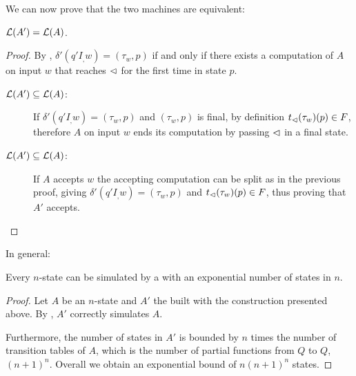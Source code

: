 We can now prove that the two machines are equivalent:
\begin{thrm}\label{thm:transtab2DFA}
	$\mathcal L(A')=\mathcal L(A)$.
\end{thrm}
\begin{proof}
	By , $\delta'(q'I_,w)=(\tau_w,p)$ if and only if there exists a computation of $A$ on input $w$ that reaches $\lhd$ for the first time in state $p$.
	\begin{description}
		\item[$\mathcal L(A')\subseteq\mathcal L(A)$:] If $\delta'(q'I_,w)=(\tau_w,p)$ and $(\tau_w,p)$ is final, by definition $t_\lhd(\tau_w)(p)\in F$, therefore $A$ on input $w$ ends its computation by passing $\lhd$ in a final state.
		\item[$\mathcal L(A')\subseteq\mathcal L(A)$:] If $A$ accepts $w$ the accepting computation can be split as in the previous proof, giving $\delta'(q'I_,w)=(\tau_w,p)$ and $t_\lhd(\tau_w)(p)\in F$, thus proving that $A'$ accepts. \qedhere
	\end{description}
\end{proof}

In general:
\begin{thrm}
	Every $n$-state \TDFA can be simulated by a \ODFA with an exponential number of states in $n$.
\end{thrm}
\begin{proof}
	Let $A$ be an $n$-state \TDFA and $A'$ the \ODFA built with the construction presented above.
	By , $A'$ correctly simulates $A$.

	Furthermore, the number of states in $A'$ is bounded by $n$ times the number of transition tables of $A$, which is the number of partial functions from $Q$ to $Q$, \ie $(n+1)^n$.
	Overall we obtain an exponential bound of $n(n+1)^n$ states.
\end{proof}
